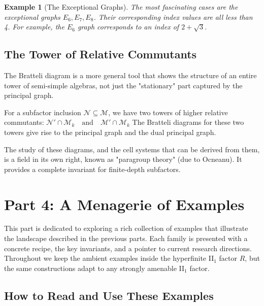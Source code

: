 \documentclass[11pt, a4paper]{article}
\theoremstyle{colored_def}
\theoremstyle{colored_thm}
\theoremstyle{colored_ex}
\newtheorem{example}{Example}[section]
\newcommand{\M}{\mathcal{M}}
\newcommand{\N}{\mathcal{N}}
\begin{document}
\begin{example}[The Exceptional Graphs]
The most fascinating cases are the exceptional graphs $E_6, E_7, E_8$. Their corresponding index values are all less than 4. For example, the $E_6$ graph corresponds to an index of $2 + \sqrt{3}$.
\end{example}

\subsection{The Tower of Relative Commutants}

The Bratteli diagram is a more general tool that shows the structure of an entire tower of semi-simple algebras, not just the "stationary" part captured by the principal graph.

For a subfactor inclusion $\N \subseteq \M$, we have two towers of higher relative commutants:
$ \N' \cap \M_k \quad \text{and} \quad \M' \cap \M_k $
The Bratteli diagrams for these two towers give rise to the principal graph and the dual principal graph.

The study of these diagrams, and the cell systems that can be derived from them, is a field in its own right, known as "paragroup theory" (due to Ocneanu). It provides a complete invariant for finite-depth subfactors.

\section{Part 4: A Menagerie of Examples}\label{sec:part4}

This part is dedicated to exploring a rich collection of examples that illustrate the landscape described in the previous parts. Each family is presented with a concrete recipe, the key invariants, and a pointer to current research directions. Throughout we keep the ambient examples inside the hyperfinite II$_1$ factor $R$, but the same constructions adapt to any strongly amenable II$_1$ factor.

\subsection{How to Read and Use These Examples}\label{subsec:part4-roadmap}
\end{document}
